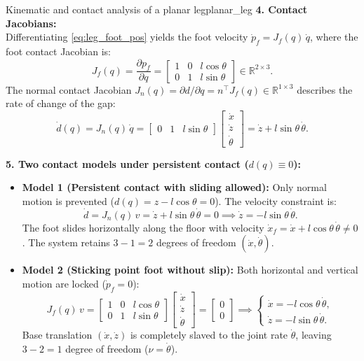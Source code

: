 \documentclass[11pt,a4paper]{article}
\newcommand{\R}{\mathbb{R}}
\begin{document}
\begin{example}{Kinematic and contact analysis of a planar leg}{planar_leg}
\textbf{4. Contact Jacobians:}\\
Differentiating \eqref{eq:leg_foot_pos} yields the foot velocity $\dot p_f = J_f(q)\,\dot q$, where the foot contact Jacobian is:
\begin{equation}\label{eq:leg_jf}
  J_f(q) = \frac{\partial p_f}{\partial q} = \begin{bmatrix} 1 & 0 & l\cos\theta \\ 0 & 1 & l\sin\theta \end{bmatrix} \in \R^{2 \times 3}.
\end{equation}
The normal contact Jacobian $J_n(q) = \partial d/\partial q = n^\top J_f(q) \in \R^{1 \times 3}$ describes the rate of change of the gap:
\begin{equation}\label{eq:leg_jn}
  \dot d(q) = J_n(q)\,\dot q = \begin{bmatrix} 0 & 1 & l\sin\theta \end{bmatrix} \begin{bmatrix} \dot x \\ \dot z \\ \dot\theta \end{bmatrix} = \dot z + l\sin\theta\,\dot\theta.
\end{equation}

\textbf{5. Two contact models under persistent contact ($d(q) \equiv 0$):}\\
\begin{itemize}[nosep]
  \item \textbf{Model 1 (Persistent contact with sliding allowed):}
  Only normal motion is prevented ($d(q) = z - l\cos\theta = 0$). The velocity constraint is:
  \[
    \dot d = J_n(q)\,v = \dot z + l\sin\theta\,\dot\theta = 0 \implies \dot z = -l\sin\theta\,\dot\theta.
  \]
  The foot slides horizontally along the floor with velocity $\dot x_f = \dot x + l\cos\theta\,\dot\theta \neq 0$. The system retains $3 - 1 = 2$ degrees of freedom $(\dot x, \dot\theta)$.
  \item \textbf{Model 2 (Sticking point foot without slip):}
  Both horizontal and vertical motion are locked ($\dot p_f = 0$):
  \[
    J_f(q)\,v = \begin{bmatrix} 1 & 0 & l\cos\theta \\ 0 & 1 & l\sin\theta \end{bmatrix} \begin{bmatrix} \dot x \\ \dot z \\ \dot\theta \end{bmatrix} = \begin{bmatrix} 0 \\ 0 \end{bmatrix} \implies
    \begin{cases}
      \dot x = -l\cos\theta\,\dot\theta, \\
      \dot z = -l\sin\theta\,\dot\theta.
    \end{cases}
  \]
  Base translation $(\dot x, \dot z)$ is completely slaved to the joint rate $\dot\theta$, leaving $3 - 2 = 1$ degree of freedom ($\nu = \dot\theta$).
\end{itemize}


\end{example}
\end{document}
